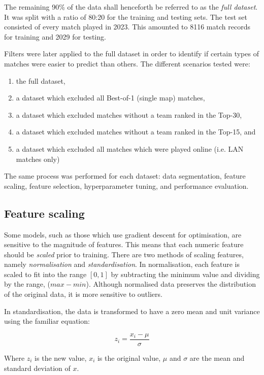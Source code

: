 The remaining 90\% of the data shall henceforth be referred to as the \textit{full dataset}. It was split with a ratio of 80:20 for the training and testing sets. The test set consisted of every match played in 2023. This amounted to 8116 match records for training and 2029 for testing.

Filters were later applied to the full dataset in order to identify if certain types of matches were easier to predict than others. The different scenarios tested were:
\begin{enumerate}
	\item the full dataset,
	\item a dataset which excluded all Best-of-1 (single map) matches,
	\item a dataset which excluded matches without a team ranked in the Top-30,
	\item a dataset which excluded matches without a team ranked in the Top-15, and
	\item a dataset which excluded all matches which were played online (i.e. LAN matches only)
\end{enumerate}

The same process was performed for each dataset: data segmentation, feature scaling, feature selection, hyperparameter tuning, and performance evaluation.

\subsection{Feature scaling}

Some models, such as those which use gradient descent for optimisation, are sensitive to the magnitude of features. This means that each numeric feature should be \textit{scaled} prior to training. There are two methods of scaling features, namely \textit{normalisation} and \textit{standardisation}. In normalisation, each feature is scaled to fit into the range $[0, 1]$ by subtracting the minimum value and dividing by the range, ($max-min$). Although normalised data preserves the distribution of the original data, it is more sensitive to outliers. 

In standardisation, the data is transformed to have a zero mean and unit variance using the familiar equation:

\[ z_i = \frac{x_i-\mu}{\sigma} \]

Where $z_i$ is the new value, $x_i$ is the original value, $\mu$ and $\sigma$ are the mean and standard deviation of $x$.

